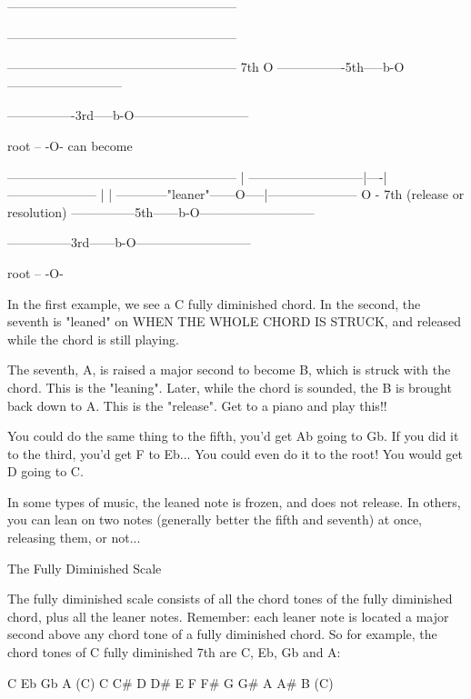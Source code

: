 ------------------------------------------------------

------------------------------------------------------

------------------------------------------------------
                   7th      O
----------------5th-----b-O---------------------------

----------------3rd-----b-O---------------------------

               root  --  -O-
can become


------------------------------------------------------
                           |
---------------------------|----|---------------------
                           |    |
------------"leaner"------O-----|---------------------
                               O  - 7th (release or resolution)
---------------5th------b-O---------------------------

---------------3rd------b-O---------------------------

              root  --   -O-


In the first example, we see a C fully diminished chord. In the second, the
seventh is "leaned" on WHEN THE WHOLE CHORD IS STRUCK, and released while the
chord is still playing.

The seventh, A, is raised a major second to become B, which is struck with the
chord. This is the "leaning". Later, while the chord is sounded, the B is
brought back down to A. This is the "release". Get to a piano and play this!!

You could do the same thing to the fifth, you'd get Ab going to Gb. If you did
it to the third, you'd get F to Eb... You could even do it to the root! You
would get D going to C.

In some types of music, the leaned note is frozen, and does not release. In
others, you can lean on two notes (generally better the fifth and seventh) at
once, releasing them, or not...

The Fully Diminished Scale

The fully diminished scale consists of all the chord tones of the fully
diminished chord, plus all the leaner notes. Remember: each leaner note is
located a major second above any chord tone of a fully diminished chord.
So for example, the chord tones of C fully diminished 7th are C, Eb, Gb and A:

C              Eb             Gb             A              (C)
C    C\#   D    D\#   E    F    F\#   G    G\#   A    A\#   B    (C)

